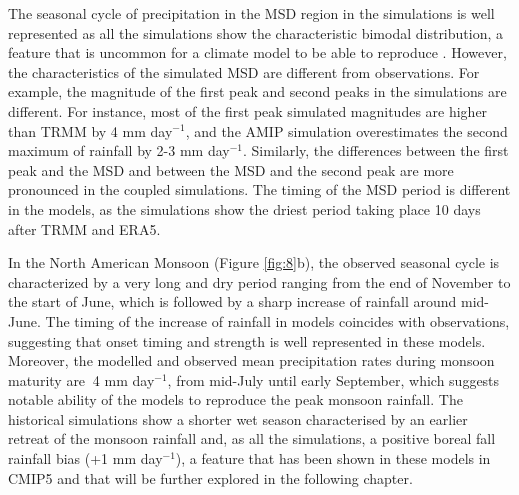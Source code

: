 The seasonal cycle of precipitation in the MSD region in the simulations is well represented as all the simulations show the characteristic bimodal distribution, a feature that is uncommon for a climate model to be able to reproduce \citep{ryu2014}.
However, the characteristics of the simulated MSD are different from observations.
For example, the magnitude of the first peak and second peaks in the simulations are different. 
For instance, most of the first peak simulated magnitudes are higher than TRMM by 4 mm day$^{-1}$, and the AMIP simulation overestimates the second maximum of rainfall by 2-3 mm day$^{-1}$. Similarly, the differences between the first peak and the MSD and between the MSD and the second peak are more pronounced in the coupled simulations. The timing of the MSD period is different in the models, as the simulations show the driest period taking place 10 days after TRMM and ERA5. %
 
 

In the North American Monsoon (Figure \ref{fig:8}b), the observed seasonal cycle is characterized by a very long and dry period ranging from the end of November to the start of June, which is followed by a sharp increase of rainfall around mid-June. The timing of the increase of rainfall in models coincides with observations, suggesting that onset timing and strength is well represented in these models.
Moreover, the modelled and observed mean precipitation rates during monsoon maturity are $~$4 mm day$^{-1}$, from mid-July until early September, which suggests notable ability of the models to reproduce the peak monsoon rainfall.
   The historical simulations show a shorter wet season characterised by an earlier retreat of the monsoon rainfall and, as all the simulations, a positive boreal fall rainfall bias (+1 mm day$^{-1}$), a feature that has been shown in these models in CMIP5 \citep{geil2013} and that will be further explored in the following chapter. %


